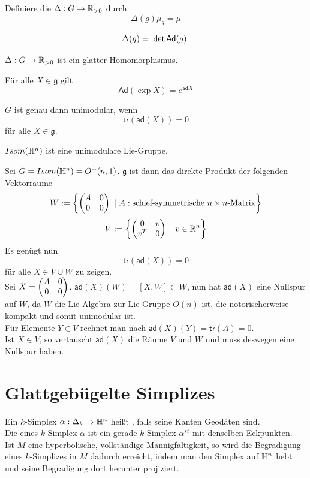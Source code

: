 \documentclass{book}
\newcommand{\g}{\mathfrak{g}}
\begin{document}
\Def{}
Definiere die  $\Delta : G \overset{}{\rightarrow} \mathbb{R}_{>0}$ durch
\[ \Delta(g) \mu_g = \mu \]

\Prop{}
\[ \Delta(g) = \left|\det \textsf{Ad}(g)\right| \]

\Kor{}
$\Delta : G \overset{}{\rightarrow} \mathbb{R}_{>0}$ ist ein glatter Homomorphismus.

\Bem{}
Für alle $X \in \g$ gilt
\[ \textsf{Ad}(\exp X) = e^{\textsf{ad} X} \]

\Kor{}
$G$ ist genau dann unimodular, wenn
\[ \textsf{tr}(\textsf{ad}(X)) = 0 \]
für alle $X \in \g$.

\Prop{}
$Isom(\mathbb{H}^n)$ ist eine unimodulare Lie-Gruppe.
\begin{Beweis}{}
	Sei $G = Isom(\mathbb{H}^n) = O^+(n,1)$. $\g$ ist dann das direkte Produkt der folgenden Vektorräume
	\[ W := \set{
\klam{
\begin{matrix}
A & 0\\
0 & 0
\end{matrix}
}	
}{A : \text{schief-symmetrische }n\times n \text{-Matrix}} \]
	\[ V := \set{
	\klam{
		\begin{matrix}
		0 & v\\
		v^T & 0
		\end{matrix}
	}	
}{v\in \R^n} \]
Es genügt nun
\[ \textsf{tr}(\textsf{ad}(X)) = 0 \]
für alle $X \in V\cup W$ zu zeigen.\\
Sei $X = \left(
	\begin{matrix}
	A & 0\\
	0 & 0
	\end{matrix}
\right)$. $\textsf{ad}(X)(W) = [X,W] \subset W$, nun hat $\textsf{ad}(X)$ eine Nullspur auf $W$, da $W$ die Lie-Algebra zur Lie-Gruppe $O(n)$ ist, die notorischerweise kompakt und somit unimodular ist.\\
Für Elemente $Y \in V$ rechnet man nach $\textsf{ad}(X)(Y) = \textsf{tr}(A) = 0$.\\
Ist $X \in V$, so vertauscht $\textsf{ad}(X)$ die Räume $V$ und $W$ und muss deswegen eine Nullspur haben.
\end{Beweis}

\section{Glattgebügelte Simplizes}
\Def{}
Ein $k$-Simplex $\alpha : \Delta_k \overset{}{\rightarrow} \mathbb{H}^n$ heißt , falls seine Kanten Geodäten sind.\\
Die  eines $k$-Simplex $\alpha$ ist ein gerade $k$-Simplex $\alpha^{st}$ mit denselben Eckpunkten.\\
Ist $M$ eine hyperbolische, vollständige Mannigfaltigkeit, so wird die Begradigung eines $k$-Simplizes in $M$ dadurch erreicht, indem man den Simplex auf $\mathbb{H}^n$ hebt und seine Begradigung dort herunter projiziert.
\end{document}

